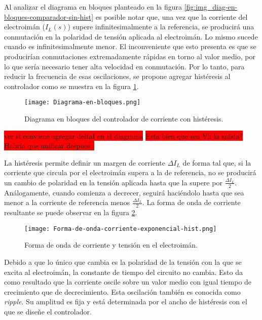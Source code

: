 Al analizar el diagrama en bloques planteado en la figura \ref{fig:img_diag-en-bloques-comparador-sin-hist} es posible notar que, una vez que la corriente del electroimán ($I_{L}(s)$) supere infinitesimalmente a la referencia, se producirá una conmutación en la polaridad de tensión aplicada al electroimán. Lo mismo sucede cuando es infinitesimalmente menor. El inconveniente que esto presenta es que se producirían conmutaciones extremadamente rápidas en torno al valor medio, por lo que sería necesario tener alta velocidad en conmutación. Por lo tanto, para reducir la frecuencia de esas oscilaciones, se propone agregar histéresis al controlador como se muestra en la figura \ref{fig:img_diag-en-bloques}.

\begin{figure}[H]
	\centering
	\texttt{[image: Diagrama-en-bloques.png]}
	\caption{Diagrama en bloques del controlador de corriente con histéresis.}
	\label{fig:img_diag-en-bloques}
\end{figure}

\colorbox{red}{ver si conviene agregar deltaI en el diagrama}
\colorbox{red}{Esta bien que sea Vh la salida? Habría que unificar despues..}

La histéresis permite definir un margen de corriente $\Delta I_L$ de forma tal que, si la corriente que circula por el electroimán supera a la de referencia, no se producirá un cambio de polaridad en la tensión aplicada hasta que la supere por $\frac{\Delta I_L}{2}$. Análogamente, cuando comienza a decrecer, seguirá haciéndolo hasta que sea menor a la corriente de referencia menos $\frac{\Delta I_L}{2}$. La forma de onda de corriente resultante se puede observar en la figura \ref{fig:img_corriente_exponencial-hist}.

\begin{figure}[H]
	\centering
	\texttt{[image: Forma-de-onda-corriente-exponencial-hist.png]}
	\caption{Forma de onda de corriente y tensión en el electroimán.}
	\label{fig:img_corriente_exponencial-hist}
\end{figure}




Debido a que lo único que cambia es la polaridad de la tensión con la que se excita al electroimán, la constante de tiempo del circuito no cambia. Esto da como resultado  que la corriente oscile sobre un valor medio con igual tiempo de crecimiento que de decrecimiento. Esta oscilación también es conocida como \textsl{ripple}. Su amplitud es fija y está determinada por el ancho de histéresis con el que se diseñe el controlador. 



